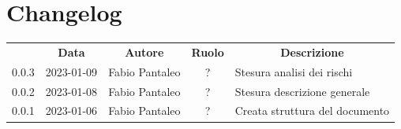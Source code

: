 \thispagestyle{empty}
\section*{Changelog}
\begin{table}[H]
\centering
\renewcommand{\arraystretch}{1.8}
	\begin{longtable}[c]{c | c | c | c | p{5cm}}
		\rowcolor[HTML]{a52a2a}
        \multicolumn{1}{c}{\color[HTML]{FFFFFF} \textbf{Versione}} &
        \multicolumn{1}{c}{\color[HTML]{FFFFFF} \textbf{Data}} &
        \multicolumn{1}{c}{\color[HTML]{FFFFFF} \textbf{Autore}} &
        \multicolumn{1}{c}{\color[HTML]{FFFFFF} \textbf{Ruolo}}     &
        \multicolumn{1}{c}{\color[HTML]{FFFFFF} \textbf{Descrizione}}                                                                                                                                                                   
        \\

    0.0.3 & 2023-01-09 & Fabio Pantaleo & ? & Stesura analisi dei rischi  \\
    0.0.2 & 2023-01-08 & Fabio Pantaleo & ? & Stesura descrizione generale \\    
    0.0.1 & 2023-01-06 & Fabio Pantaleo & ? & Creata struttura del documento \\
	
    \end{longtable}
	
\end{table}